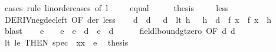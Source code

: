 \begin{isabellebody}
%
\isadelimproof
%
\endisadelimproof
%
\isatagproof
{}\isamarkupfalse%
\ {\isacharparenleft}{\kern0pt}cases\ rule{\isacharcolon}{\kern0pt}\ linorder{\isacharunderscore}{\kern0pt}cases\ {\isacharbrackleft}{\kern0pt}of\ l\ {}{\isacharbrackright}{\kern0pt}{\isacharparenright}{\kern0pt}\isanewline
\ \ \isamarkupfalse%
\ equal\isanewline
\ \ \isamarkupfalse%
\ \isamarkupfalse%
\ {\isacharquery}{\kern0pt}thesis\ \isacommand{{\isachardot}{\kern0pt}}\isamarkupfalse%
\isanewline
{}\isamarkupfalse%
\isanewline
\ \ \isamarkupfalse%
\ less\isanewline
\ \ \isamarkupfalse%
\ DERIV{\isacharunderscore}{\kern0pt}neg{\isacharunderscore}{\kern0pt}dec{\isacharunderscore}{\kern0pt}left\ {\isacharbrackleft}{\kern0pt}OF\ der\ less{\isacharbrackright}{\kern0pt}\isanewline
\ \ \isamarkupfalse%
\ d{\isacharprime}{\kern0pt}\ \ d{\isacharprime}{\kern0pt}{\isacharcolon}{\kern0pt}\ {\isachardoublequoteopen}{}\ {\isacharless}{\kern0pt}\ d{\isacharprime}{\kern0pt}{\isachardoublequoteclose}\ \ lt{\isacharcolon}{\kern0pt}\ {\isachardoublequoteopen}{\isasymforall}h\ {\isachargreater}{\kern0pt}\ {}{\isachardot}{\kern0pt}\ h\ {\isacharless}{\kern0pt}\ d{\isacharprime}{\kern0pt}\ {\isasymlongrightarrow}\ f\ x\ {\isacharless}{\kern0pt}\ f\ {\isacharparenleft}{\kern0pt}x\ {\isacharminus}{\kern0pt}\ h{\isacharparenright}{\kern0pt}{\isachardoublequoteclose}\isanewline
\ \ \ \ \isamarkupfalse%
\ blast\isanewline
\ \ \isamarkupfalse%
\ e\ \ {\isachardoublequoteopen}{}\ {\isacharless}{\kern0pt}\ e\ {\isasymand}\ e\ {\isacharless}{\kern0pt}\ d\ {\isasymand}\ e\ {\isacharless}{\kern0pt}\ d{\isacharprime}{\kern0pt}{\isachardoublequoteclose}\isanewline
\ \ \ \ \isamarkupfalse%
\ field{\isacharunderscore}{\kern0pt}lbound{\isacharunderscore}{\kern0pt}gt{\isacharunderscore}{\kern0pt}zero\ {\isacharbrackleft}{\kern0pt}OF\ d\ d{\isacharprime}{\kern0pt}{\isacharbrackright}{\kern0pt}\ \ \isacommand{{\isachardot}{\kern0pt}{\isachardot}{\kern0pt}}\isamarkupfalse%
\isanewline
\ \ \isamarkupfalse%
\ lt\ le\ {\isacharbrackleft}{\kern0pt}THEN\ spec\ {\isacharbrackleft}{\kern0pt}\ x{\isacharequal}{\kern0pt}{\isachardoublequoteopen}x\ {\isacharminus}{\kern0pt}\ e{\isachardoublequoteclose}{\isacharbrackright}{\kern0pt}{\isacharbrackright}{\kern0pt}\ \isamarkupfalse%
\ {\isacharquery}{\kern0pt}thesis\isanewline

\end{isabellebody}
